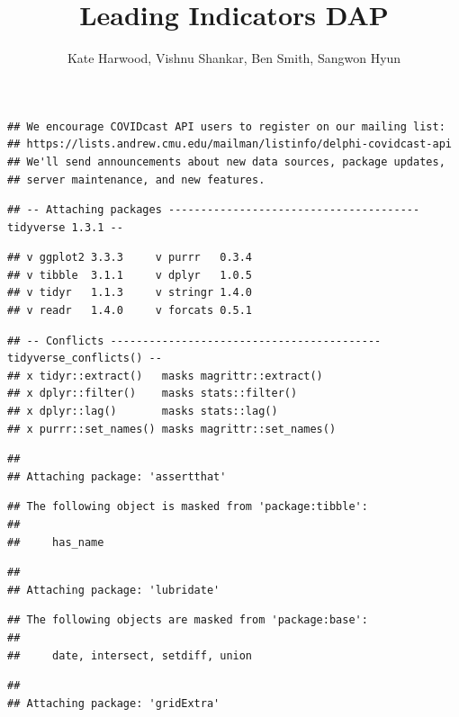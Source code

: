 \documentclass[]{article}
\title{Leading Indicators DAP}
\author{Kate Harwood, Vishnu Shankar, Ben Smith, Sangwon Hyun}
\date{}
\begin{document}
\maketitle

{
\setcounter{tocdepth}{2}
\tableofcontents
}
\begin{verbatim}
## We encourage COVIDcast API users to register on our mailing list:
## https://lists.andrew.cmu.edu/mailman/listinfo/delphi-covidcast-api
## We'll send announcements about new data sources, package updates,
## server maintenance, and new features.
\end{verbatim}

\begin{verbatim}
## -- Attaching packages --------------------------------------- tidyverse 1.3.1 --
\end{verbatim}

\begin{verbatim}
## v ggplot2 3.3.3     v purrr   0.3.4
## v tibble  3.1.1     v dplyr   1.0.5
## v tidyr   1.1.3     v stringr 1.4.0
## v readr   1.4.0     v forcats 0.5.1
\end{verbatim}

\begin{verbatim}
## -- Conflicts ------------------------------------------ tidyverse_conflicts() --
## x tidyr::extract()   masks magrittr::extract()
## x dplyr::filter()    masks stats::filter()
## x dplyr::lag()       masks stats::lag()
## x purrr::set_names() masks magrittr::set_names()
\end{verbatim}

\begin{verbatim}
## 
## Attaching package: 'assertthat'
\end{verbatim}

\begin{verbatim}
## The following object is masked from 'package:tibble':
## 
##     has_name
\end{verbatim}

\begin{verbatim}
## 
## Attaching package: 'lubridate'
\end{verbatim}

\begin{verbatim}
## The following objects are masked from 'package:base':
## 
##     date, intersect, setdiff, union
\end{verbatim}

\begin{verbatim}
## 
## Attaching package: 'gridExtra'
\end{verbatim}
\end{document}

